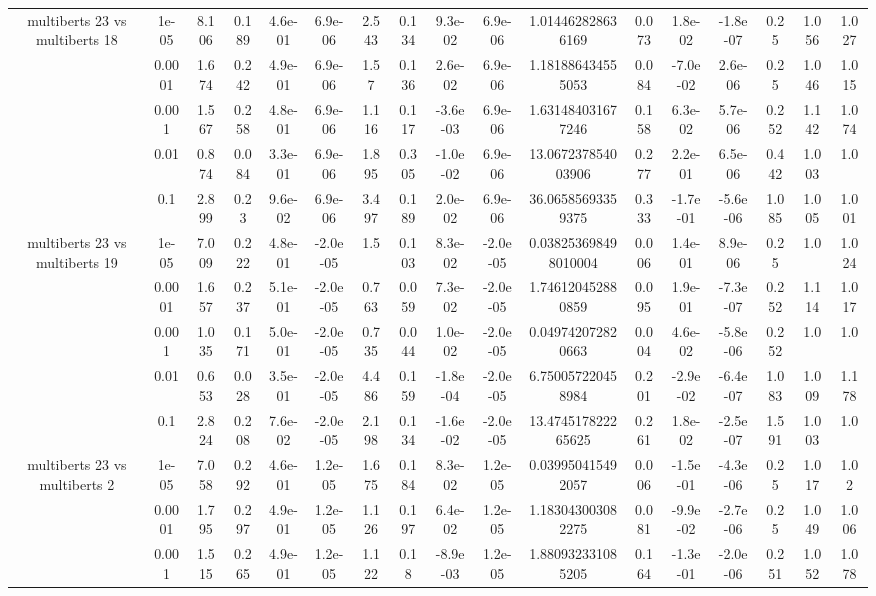 \begin{tabular}{|c|c|c|c|c|c|c|c|c|c|c|c|c|c|c|c|c|}
\hline
\multirow{5}{*}{multiberts 23 vs multiberts 18} & 1e-05 & 8.106 & 0.189 & 4.6e-01 & 6.9e-06 & 2.543 & 0.134 & 9.3e-02 & 6.9e-06 & 1.014462828636169 & 0.073 & 1.8e-02 & -1.8e-07 & 0.25 & 1.056 & 1.027 \\
 & 0.0001 & 1.674 & 0.242 & 4.9e-01 & 6.9e-06 & 1.57 & 0.136 & 2.6e-02 & 6.9e-06 & 1.181886434555053 & 0.084 & -7.0e-02 & 2.6e-06 & 0.25 & 1.046 & 1.015 \\
 & 0.001 & 1.567 & 0.258 & 4.8e-01 & 6.9e-06 & 1.116 & 0.117 & -3.6e-03 & 6.9e-06 & 1.631484031677246 & 0.158 & 6.3e-02 & 5.7e-06 & 0.252 & 1.142 & 1.074 \\
 & 0.01 & 0.874 & 0.084 & 3.3e-01 & 6.9e-06 & 1.895 & 0.305 & -1.0e-02 & 6.9e-06 & 13.067237854003906 & 0.277 & 2.2e-01 & 6.5e-06 & 0.442 & 1.003 & 1.0 \\
 & 0.1 & 2.899 & 0.23 & 9.6e-02 & 6.9e-06 & 3.497 & 0.189 & 2.0e-02 & 6.9e-06 & 36.06585693359375 & 0.333 & -1.7e-01 & -5.6e-06 & 1.085 & 1.005 & 1.001 \\
\hline
\multirow{5}{*}{multiberts 23 vs multiberts 19} & 1e-05 & 7.009 & 0.222 & 4.8e-01 & -2.0e-05 & 1.5 & 0.103 & 8.3e-02 & -2.0e-05 & 0.038253698498010004 & 0.006 & 1.4e-01 & 8.9e-06 & 0.25 & 1.0 & 1.024 \\
 & 0.0001 & 1.657 & 0.237 & 5.1e-01 & -2.0e-05 & 0.763 & 0.059 & 7.3e-02 & -2.0e-05 & 1.746120452880859 & 0.095 & 1.9e-01 & -7.3e-07 & 0.252 & 1.114 & 1.017 \\
 & 0.001 & 1.035 & 0.171 & 5.0e-01 & -2.0e-05 & 0.735 & 0.044 & 1.0e-02 & -2.0e-05 & 0.049742072820663 & 0.004 & 4.6e-02 & -5.8e-06 & 0.252 & 1.0 & 1.0 \\
 & 0.01 & 0.653 & 0.028 & 3.5e-01 & -2.0e-05 & 4.486 & 0.159 & -1.8e-04 & -2.0e-05 & 6.750057220458984 & 0.201 & -2.9e-02 & -6.4e-07 & 1.083 & 1.009 & 1.178 \\
 & 0.1 & 2.824 & 0.208 & 7.6e-02 & -2.0e-05 & 2.198 & 0.134 & -1.6e-02 & -2.0e-05 & 13.474517822265625 & 0.261 & 1.8e-02 & -2.5e-07 & 1.591 & 1.003 & 1.0 \\
\hline
\multirow{5}{*}{multiberts 23 vs multiberts 2} & 1e-05 & 7.058 & 0.292 & 4.6e-01 & 1.2e-05 & 1.675 & 0.184 & 8.3e-02 & 1.2e-05 & 0.039950415492057 & 0.006 & -1.5e-01 & -4.3e-06 & 0.25 & 1.017 & 1.02 \\
 & 0.0001 & 1.795 & 0.297 & 4.9e-01 & 1.2e-05 & 1.126 & 0.197 & 6.4e-02 & 1.2e-05 & 1.183043003082275 & 0.081 & -9.9e-02 & -2.7e-06 & 0.25 & 1.049 & 1.006 \\
 & 0.001 & 1.515 & 0.265 & 4.9e-01 & 1.2e-05 & 1.122 & 0.18 & -8.9e-03 & 1.2e-05 & 1.880932331085205 & 0.164 & -1.3e-01 & -2.0e-06 & 0.251 & 1.052 & 1.078 \\

\end{tabular}
